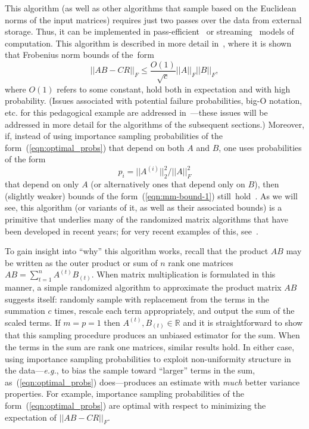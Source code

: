 \documentclass[twoside]{article}
\begin{document}
This algorithm (as well as other algorithms that sample based on 
the Euclidean norms of the input matrices) requires just two passes over the 
data from external storage.  Thus, it can be implemented in 
pass-efficient~\cite{dkm_matrix1} or streaming~\cite{Muthu05} models of 
computation.
This algorithm is described in more detail in~\cite{dkm_matrix1},
where it is shown that Frobenius norm bounds of the~form
\begin{equation}
||AB-CR||_F \le \frac{O(1)}{\sqrt{c}} ||A||_F||B||_F  ,
\label{eqn:mm-bound-1}
\end{equation}
where $O(1)$ refers to some constant,
hold both in expectation and with high probability.
(Issues associated with potential failure probabilities, big-O notation, 
etc. for this pedagogical example are addressed in~\cite{dkm_matrix1}---these issues will be addressed in more detail for the algorithms of the 
subsequent sections.)
Moreover, 
if, instead of using 
importance sampling probabilities of the form~(\ref{eqn:optimal_probs}) 
that depend on both $A$ and $B$, one uses probabilities of the form 
\begin{equation}
p_i = ||A^{(i)}||_2^2/||A||_F^2
\label{eqn:optimal_probs_symmetric}
\end{equation}
that depend on only $A$ (or alternatively ones that depend only on
$B$), then (slightly weaker) bounds of the form~(\ref{eqn:mm-bound-1}) 
still~hold~\cite{dkm_matrix1}.
As we will see, this algorithm (or variants of it, as well as their associated 
bounds) is a primitive that underlies many of the randomized matrix 
algorithms that have been developed in recent years; for very recent
examples of this, see~\cite{MZ11,ESSWAI11}.

To gain insight into ``why'' this algorithm works, recall that the product 
$AB$ may be written as the outer product or sum of $n$ rank one matrices
$
AB = \sum_{t=1}^{n} A^{(t)} B_{(t)}   .
$
When matrix multiplication is formulated in this manner, a simple randomized 
algorithm to approximate the product matrix $AB$ suggests itself: 
randomly sample with replacement from the terms in the summation $c$ times, 
rescale each term appropriately, and output the sum of the scaled terms.
If $m=p=1$ then $A^{(t)},B_{(t)} \in \mathbb{R}$ and it is straightforward 
to show that this sampling procedure produces an unbiased estimator for the 
sum.
When the terms in the sum are rank one matrices, similar results hold.  
In either case, using importance sampling probabilities to exploit 
non-uniformity structure in the data---\emph{e.g.}, to bias the sample
toward ``larger'' terms in the sum, as~(\ref{eqn:optimal_probs}) 
does---produces an estimate with \emph{much} better variance properties.
For example, importance sampling probabilities of the 
form~(\ref{eqn:optimal_probs}) are optimal with respect to minimizing the
expectation of $||AB-CR||_F$.
\end{document}
